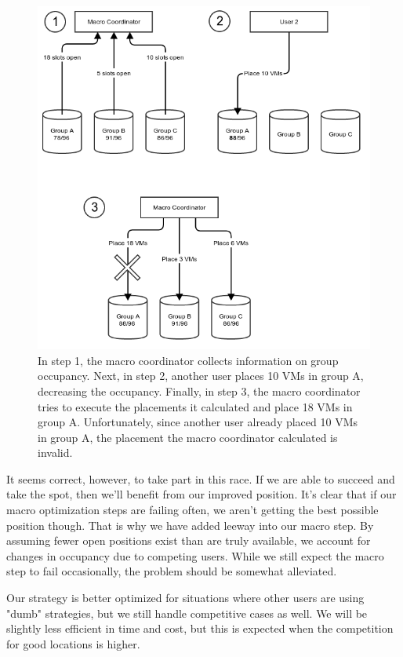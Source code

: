 \documentclass[11pt]{article}
\begin{document}
\begin{figure}
  \centering
\includegraphics[scale=0.7]{macrodelay.png}

 \caption{  In step 1, the macro coordinator collects information on group occupancy.  Next, in step 2, another user places 10 VMs in group A, decreasing the occupancy.  Finally, in step 3, the macro coordinator tries to execute the placements it calculated and place 18 VMs in group A.  Unfortunately, since another user already placed 10 VMs in group A, the placement the macro coordinator calculated is invalid. }

\end{figure}

It seems correct, however, to take part in this race. If we are able to succeed and take the spot, then we'll benefit from our improved position.  It's clear that if our macro optimization steps are failing often, we aren't getting the best possible position though.  That is why we have added leeway into our macro step.  By assuming fewer open positions exist than are truly available, we account for changes in occupancy due to competing users. While we still expect the macro step to fail occasionally, the problem should be somewhat alleviated. 

Our strategy is better optimized for situations where other users are using "dumb" strategies, but we still handle competitive cases as well. We will be slightly less efficient in time and cost, but this is expected when the competition for good locations is higher.
\end{document}
